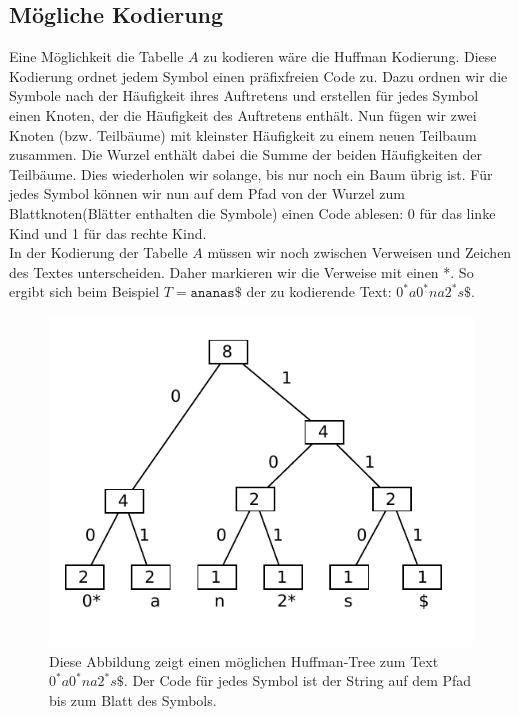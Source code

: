 \documentclass[a4paper,11pt]{scrartcl}%
\theoremstyle{change}
\theoremstyle{nonumberplain}
\theoremstyle{change}
\theoremstyle{nonumberplain}
\theoremstyle{change}
\theoremstyle{nonumberplain}
\begin{document}
		
		
	
	
	
	
	\subsection{Mögliche Kodierung}
	
	Eine Möglichkeit die Tabelle $A$ zu kodieren wäre die Huffman Kodierung. Diese Kodierung ordnet jedem Symbol einen präfixfreien Code zu. Dazu ordnen wir die Symbole nach der Häufigkeit ihres Auftretens und erstellen für jedes Symbol einen Knoten, der die Häufigkeit des Auftretens enthält. Nun fügen wir zwei Knoten (bzw. Teilbäume) mit kleinster Häufigkeit zu einem neuen Teilbaum zusammen. Die Wurzel enthält dabei die Summe der beiden Häufigkeiten der Teilbäume. Dies wiederholen wir solange, bis nur noch ein Baum übrig ist. Für jedes Symbol können wir nun auf dem Pfad von der Wurzel zum Blattknoten(Blätter enthalten die Symbole) einen Code ablesen: 0 für das linke Kind und 1 für das rechte Kind. \\
	In der Kodierung der Tabelle $A$ müssen wir noch zwischen Verweisen und Zeichen des Textes unterscheiden. Daher markieren wir die Verweise mit einen *. So ergibt sich beim Beispiel $T = \texttt{ananas\$}$ der zu kodierende Text: \texttt{$0^*a0^*na2^*s\$$}.
	\begin{figure}[h]
			\centering
			\includegraphics[scale=0.8]{huffmanTree}
			\caption{Diese Abbildung zeigt einen möglichen Huffman-Tree zum Text \texttt{$0^*a0^*na2^*s\$$}. Der Code für jedes Symbol ist der String auf dem Pfad bis zum Blatt des Symbols.}
			\label{fig:huffman}
	\end{figure}
\end{document}
